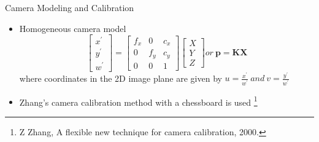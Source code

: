 \documentclass[10pt]{beamer}
\begin{document}
\begin{frame}{Camera Modeling and Calibration}
\begin{figure}[!h]
    \end{figure}
    \pause
    \begin{itemize}
        \item Homogeneous camera model
              \begin{equation}
                  \begin{bmatrix}
                      x^{\prime} \\
                      y^{\prime} \\
                      w^{\prime}
                  \end{bmatrix} =
                  \begin{bmatrix}
                      f_x & 0   & c_x \\
                      0   & f_y & c_y \\
                      0   & 0   & 1
                  \end{bmatrix}
                  \begin{bmatrix}
                      X \\
                      Y \\
                      Z
                  \end{bmatrix} or ~\mathbf{p}=\mathbf{K}\mathbf{X}
                  \label{eq:camera_model}
              \end{equation}
              where coordinates in the 2D image plane are given by $u=\frac{x^{\prime}}{w^{\prime}}~and~v=\frac{y^{\prime}}{w^{\prime}}$
        \item Zhang's camera calibration method with a chessboard is used \footnote{Z Zhang, A flexible new technique for camera calibration, 2000.}
    \end{itemize}
\end{frame}
\end{document}
